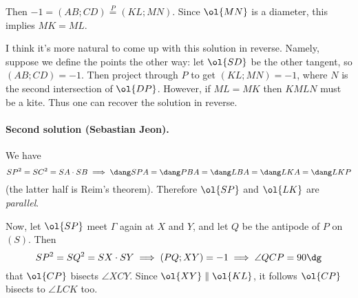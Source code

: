Then $-1 = (AB;CD) \overset{P}{=} (KL;MN)$.
Since $\ol{MN}$ is a diameter, this implies $MK = ML$.

\begin{remark*}
  I think it's more natural to come up with
  this solution in reverse.
  Namely, suppose we define the points the other way:
  let $\ol{SD}$ be the other tangent, so $(AB;CD) = -1$.
  Then project through $P$ to get $(KL;MN) = -1$,
  where $N$ is the second intersection of $\ol{DP}$.
  However, if $ML = MK$ then $KMLN$ must be a kite.
  Thus one can recover the solution in reverse.
\end{remark*}

\paragraph{Second solution (Sebastian Jeon).}
We have \[ SP^2 = SC^2 = SA \cdot SB
  \implies
  \dang SPA = \dang PBA = \dang LBA = \dang LKA = \dang LKP \]
(the latter half is Reim's theorem).
Therefore $\ol{SP}$ and $\ol{LK}$ are \emph{parallel}.

Now, let $\ol{SP}$ meet $\Gamma$ again at $X$ and $Y$,
and let $Q$ be the antipode of $P$ on $(S)$.
Then
\[ SP^2 = SQ^2 = SX \cdot SY
  \implies (PQ;XY) = -1 \implies \angle QCP = 90\dg \]
that $\ol{CP}$ bisects $\angle XCY$.
Since $\ol{XY} \parallel \ol{KL}$,
it follows $\ol{CP}$ bisects to $\angle LCK$ too.
\pagebreak